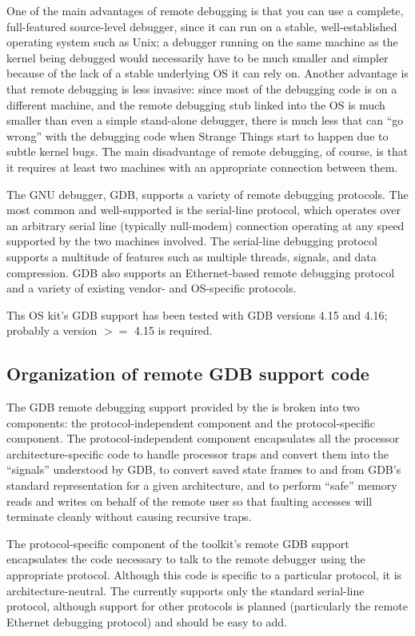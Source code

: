 One of the main advantages of remote debugging is that
you can use a complete, full-featured source-level debugger,
since it can run on a stable, well-established operating system such as Unix;
a debugger running on the same machine as the kernel being debugged
would necessarily have to be much smaller and simpler
because of the lack of a stable underlying OS it can rely on.
Another advantage is that remote debugging is less invasive:
since most of the debugging code is on a different machine,
and the remote debugging stub linked into the OS
is much smaller than even a simple stand-alone debugger,
there is much less that can ``go wrong'' with the debugging code
when Strange Things start to happen due to subtle kernel bugs.
The main disadvantage of remote debugging, of course,
is that it requires at least two machines
with an appropriate connection between them.

The GNU debugger, GDB, supports a variety of remote debugging protocols.
The most common and well-supported is the serial-line protocol,
which operates over an arbitrary serial line (typically null-modem) connection
operating at any speed supported by the two machines involved.
The serial-line debugging protocol supports a multitude of features
such as multiple threads, signals, and data compression.
GDB also supports an Ethernet-based remote debugging protocol
and a variety of existing vendor- and OS-specific protocols.

Ths OS kit's GDB support has been tested with GDB versions 4.15 and 4.16;
probably a version $>=$ 4.15 is required.

\subsection{Organization of remote GDB support code}

The GDB remote debugging support provided by the \oskit{}
is broken into two components:
the protocol-independent component and the protocol-specific component.
The protocol-independent component
encapsulates all the processor architecture-specific code
to handle processor traps
and convert them into the ``signals'' understood by GDB,
to convert saved state frames to and from
GDB's standard representation for a given architecture,
and to perform ``safe'' memory reads and writes on behalf of the remote user
so that faulting accesses will terminate cleanly
without causing recursive traps.

The protocol-specific component of the toolkit's remote GDB support
encapsulates the code necessary to talk to the remote debugger
using the appropriate protocol.
Although this code is specific to a particular protocol,
it is architecture-neutral.
The \oskit{} currently supports only the standard serial-line protocol,
although support for other protocols is planned
(particularly the remote Ethernet debugging protocol)
and should be easy to add.

